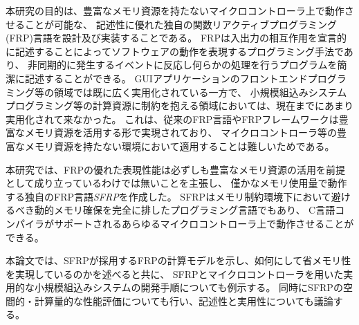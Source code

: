 本研究の目的は、豊富なメモリ資源を持たないマイクロコントローラ上で動作させることが可能な、
記述性に優れた独自の関数リアクティブプログラミング(FRP)言語を設計及び実装することである。
FRPは入出力の相互作用を宣言的に記述することによってソフトウェアの動作を表現するプログラミング手法であり、
非同期的に発生するイベントに反応し何らかの処理を行うプログラムを簡潔に記述することができる。
GUIアプリケーションのフロントエンドプログラミング等の領域では既に広く実用化されている一方で、
小規模組込みシステムプログラミング等の計算資源に制約を抱える領域においては、現在までにあまり実用化されて来なかった。
これは、従来のFRP言語やFRPフレームワークは豊富なメモリ資源を活用する形で実現されており、
マイクロコントローラ等の豊富なメモリ資源を持たない環境において適用することは難しいためである。

本研究では、FRPの優れた表現性能は必ずしも豊富なメモリ資源の活用を前提として成り立っているわけでは無いことを主張し、
僅かなメモリ使用量で動作する独自のFRP言語{\it SFRP}を作成した。
SFRPはメモリ制約環境下において避けるべき動的メモリ確保を完全に排したプログラミング言語でもあり、
C言語コンパイラがサポートされるあらゆるマイクロコントローラ上で動作させることができる。

本論文では、SFRPが採用するFRPの計算モデルを示し、如何にして省メモリ性を実現しているのかを述べると共に、
SFRPとマイクロコントローラを用いた実用的な小規模組込みシステムの開発手順についても例示する。
同時にSFRPの空間的・計算量的な性能評価についても行い、記述性と実用性についても議論する。
